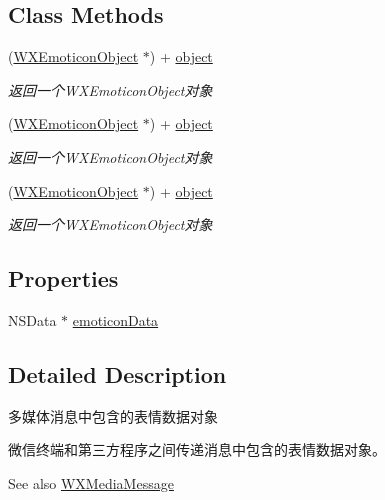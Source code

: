 \subsection*{Class Methods}
\begin{DoxyCompactItemize}
\item 
(\mbox{\hyperlink{interface_w_x_emoticon_object}{W\+X\+Emoticon\+Object}} $\ast$) + \mbox{\hyperlink{interface_w_x_emoticon_object_a6e2f8dfd9230c48f9876dbdf90e61db3}{object}}
\begin{DoxyCompactList}\small\item\em 返回一个\+W\+X\+Emoticon\+Object对象 \end{DoxyCompactList}\item 
(\mbox{\hyperlink{interface_w_x_emoticon_object}{W\+X\+Emoticon\+Object}} $\ast$) + \mbox{\hyperlink{interface_w_x_emoticon_object_a6e2f8dfd9230c48f9876dbdf90e61db3}{object}}
\begin{DoxyCompactList}\small\item\em 返回一个\+W\+X\+Emoticon\+Object对象 \end{DoxyCompactList}\item 
(\mbox{\hyperlink{interface_w_x_emoticon_object}{W\+X\+Emoticon\+Object}} $\ast$) + \mbox{\hyperlink{interface_w_x_emoticon_object_a6e2f8dfd9230c48f9876dbdf90e61db3}{object}}
\begin{DoxyCompactList}\small\item\em 返回一个\+W\+X\+Emoticon\+Object对象 \end{DoxyCompactList}\end{DoxyCompactItemize}
\subsection*{Properties}
\begin{DoxyCompactItemize}
\item 
N\+S\+Data $\ast$ \mbox{\hyperlink{interface_w_x_emoticon_object_a9a00b45ef65b19ff47a971b58123ace0}{emoticon\+Data}}
\end{DoxyCompactItemize}


\subsection{Detailed Description}
多媒体消息中包含的表情数据对象 

微信终端和第三方程序之间传递消息中包含的表情数据对象。 \begin{DoxySeeAlso}{See also}
\mbox{\hyperlink{interface_w_x_media_message}{W\+X\+Media\+Message}} 
\end{DoxySeeAlso}


